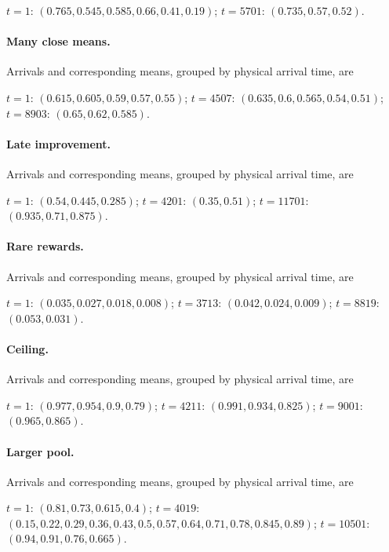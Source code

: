 \documentclass[11pt]{article}
\theoremstyle{remark}
\begin{document}
$t=1$: $(0.765,\allowbreak 0.545,\allowbreak 0.585,\allowbreak 0.66,\allowbreak 0.41,\allowbreak 0.19)$; $t=5701$: $(0.735,\allowbreak 0.57,\allowbreak 0.52)$.

\paragraph{Many close means.} Arrivals and corresponding means, grouped by physical arrival time, are

$t=1$: $(0.615,\allowbreak 0.605,\allowbreak 0.59,\allowbreak 0.57,\allowbreak 0.55)$; $t=4507$: $(0.635,\allowbreak 0.6,\allowbreak 0.565,\allowbreak 0.54,\allowbreak 0.51)$; $t=8903$: $(0.65,\allowbreak 0.62,\allowbreak 0.585)$.

\paragraph{Late improvement.} Arrivals and corresponding means, grouped by physical arrival time, are

$t=1$: $(0.54,\allowbreak 0.445,\allowbreak 0.285)$; $t=4201$: $(0.35,\allowbreak 0.51)$; $t=11701$: $(0.935,\allowbreak 0.71,\allowbreak 0.875)$.

\paragraph{Rare rewards.} Arrivals and corresponding means, grouped by physical arrival time, are

$t=1$: $(0.035,\allowbreak 0.027,\allowbreak 0.018,\allowbreak 0.008)$; $t=3713$: $(0.042,\allowbreak 0.024,\allowbreak 0.009)$; $t=8819$: $(0.053,\allowbreak 0.031)$.

\paragraph{Ceiling.} Arrivals and corresponding means, grouped by physical arrival time, are

$t=1$: $(0.977,\allowbreak 0.954,\allowbreak 0.9,\allowbreak 0.79)$; $t=4211$: $(0.991,\allowbreak 0.934,\allowbreak 0.825)$; $t=9001$: $(0.965,\allowbreak 0.865)$.

\paragraph{Larger pool.} Arrivals and corresponding means, grouped by physical arrival time, are

$t=1$: $(0.81,\allowbreak 0.73,\allowbreak 0.615,\allowbreak 0.4)$; $t=4019$: $(0.15,\allowbreak 0.22,\allowbreak 0.29,\allowbreak 0.36,\allowbreak 0.43,\allowbreak 0.5,\allowbreak 0.57,\allowbreak 0.64,\allowbreak 0.71,\allowbreak 0.78,\allowbreak 0.845,\allowbreak 0.89)$; $t=10501$: $(0.94,\allowbreak 0.91,\allowbreak 0.76,\allowbreak 0.665)$.
\end{document}
